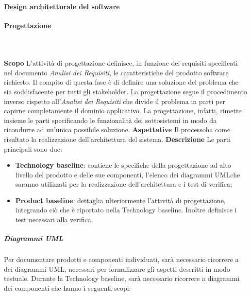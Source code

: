 			\paragraph{Design architetturale del software} 

		\paragraph{Progettazione} \mbox{}\\ \mbox{}\\
			\textbf{Scopo} \newline \newline
			L'attività di progettazione definisce, in funzione dei requisiti specificati nel documento \textit{Analisi dei Requisiti}, le caratteristiche del prodotto software richiesto. Il compito di questa fase è di definire una soluzione del problema che sia soddisfacente per tutti gli stakeholder\glo. La progettazione segue il procedimento inverso rispetto all'\textit{Analisi dei Requisiti} che divide il problema in parti per capirne completamente il dominio applicativo. La progettazione, infatti, rimette insieme le parti specificando le funzionalità dei sottosistemi in modo da ricondurre ad un'unica possibile soluzione. \newline \newline
			\textbf{Aspettative} \newline \newline
			Il processo\glosp ha come risultato la realizzazione dell'architettura del sistema. \newline \newline
			\textbf{Descrizione} \newline \newline
			Le parti principali sono due:
			\begin{itemize}
				\item \textbf{Technology baseline}\glo: contiene le specifiche della progettazione ad alto livello del prodotto e delle sue componenti, l'elenco dei diagrammi UML\glosp che saranno utilizzati per la realizzazione dell'architettura e i test di verifica;
				\item \textbf{Product baseline}\glo: dettaglia ulteriormente l'attività di progettazione, integrando ciò che è riportato nella Technology baseline. Inoltre definisce i test necessari alla verifica.
			\end{itemize}
			\subparagraph{Diagrammi UML}
			Per documentare prodotti e componenti individuati, sarà necessario ricorrere a dei diagrammi UML\glo, necessari per formalizzare gli aspetti descritti in modo testuale. Durante la Technology baseline, sarà necessario ricorrere a diagrammi dei componenti che hanno i seguenti scopi:
